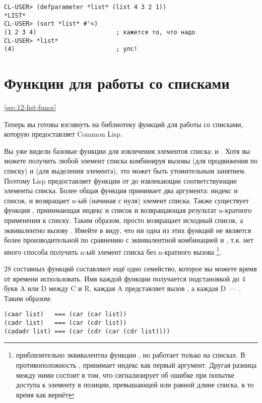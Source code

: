 \begin{lstlisting}
CL-USER> (defparameter *list* (list 4 3 2 1))
*LIST*
CL-USER> (sort *list* #'<)
(1 2 3 4)                      ; кажется то, что надо
CL-USER> *list*
(4)                            ; упс!
\end{lstlisting}


\section{Функции для работы со списками}
\ref{sec:12-list-funcs}

Теперь вы готовы взглянуть на библиотеку функций для работы со списками, которую
предоставляет Common Lisp.

Вы уже видели базовые функции для извлечения элементов списка:  и
. Хотя вы можете получить любой элемент списка комбинируя вызовы 
(для продвижения по списку) и  (для выделения элемента), это может быть
утомительным занятием. Поэтому Lisp предоставляет функции от  до 
извлекающие соответствующие элементы списка. Более общая функция  принимает два
аргумента: индекс и список, и возвращает n-ый (начиная с нуля) элемент списка. Также
существует функция , принимающая индекс и список и возвращающая результат
n-кратного применения  к списку. Таким образом,   просто
возвращает исходный список, а   эквивалентно вызову
. Имейте в виду, что ни одна из этих функций не является более производительной
по сравнению с эквивалентной комбинацией  и , т.к. нет иного
способа получить n-ый элемент списка без n-кратного вызова \footnote{
  приблизительно эквивалентна функции , но работает только на списках. В
  противоположность ,  принимает индекс как первый аргумент. Другая
  разница между ними состоит в том, что  сигнализирует об ошибке при попытке
  доступа к элементу в позиции, превышающей или равной длине списка, в то время как
   вернёт }.

28 составных  функций составляют ещё одно семейство, которое вы можете время
от времени использовать. Имя каждой функции получается подстановкой до 4 букв A или D
между C и R, каждая A представляет вызов , а каждая D~--- . Таким
образом:

\begin{lstlisting}
(caar list)   === (car (car list))
(cadr list)   === (car (cdr list))
(cadadr list) === (car (cdr (car (cdr list))))
\end{lstlisting}

